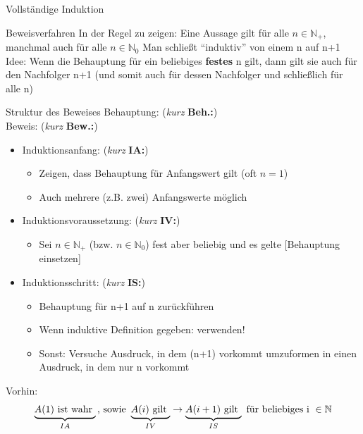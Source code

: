 \documentclass{beamer}
\begin{document}
\begin{frame}{Vollständige Induktion}
	\begin{itemize}
		\pitem Beweisverfahren
		\pitem In der Regel zu zeigen: Eine Aussage gilt für alle $n \in \mathbb{N}_+$, manchmal auch für alle $n \in \mathbb{N}_0$
		\pitem Man schließt ``induktiv'' von einem n auf n+1
		\pitem Idee: Wenn die Behauptung für ein beliebiges \textbf{festes} n gilt, dann gilt sie auch für den Nachfolger n+1 (und somit auch für dessen Nachfolger und schließlich für alle n)
	\end{itemize}
\end{frame}

\begin{frame}{Struktur des Beweises}
	\pause 
	Behauptung: (\textit {kurz} \textbf{Beh.:})\\
	Beweis: (\textit{kurz} \textbf{Bew.:})
	\begin{itemize}
		\pause
		\item Induktionsanfang: (\textit{kurz} \textbf{IA:})
		\begin{itemize}
			\item Zeigen, dass Behauptung für Anfangswert gilt (oft $n=1$)
			\item Auch mehrere (z.B. zwei) Anfangswerte möglich
		\end{itemize}
		\pause
		\item Induktionsvoraussetzung: (\textit{kurz} \textbf{IV:})
		\begin{itemize}
			\item Sei $n \in \mathbb{N}_+$ (bzw. $n \in \mathbb{N}_0$) fest aber beliebig und es gelte [Behauptung einsetzen]
		\end{itemize}
		\pause
		\item Induktionsschritt: (\textit{kurz} \textbf{IS:})
		\begin{itemize}
			\item Behauptung für n+1 auf n zurückführen
			\item Wenn induktive Definition gegeben: verwenden!
			\item Sonst: Versuche Ausdruck, in dem (n+1) vorkommt umzuformen in einen Ausdruck, in dem nur n vorkommt
		\end{itemize}
	\end{itemize}

	\p Vorhin:  \p
	\begin{align*}
	\underbrace{A(1) \text{ ist wahr }}_{IA} \text{, sowie } \underbrace{A(i)\text{ gilt }}_{IV} \rightarrow \underbrace{A(i+1) \text{ gilt }}_{IS} \text{ für beliebiges i }\in \mathbb{N}
	\end{align*}
\end{frame}
\end{document}
